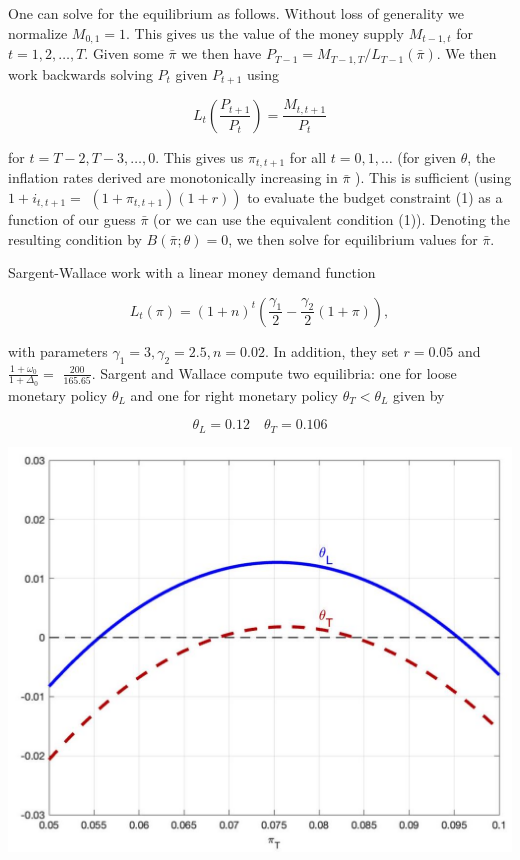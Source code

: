 \documentclass[10pt]{article}
\begin{document}
One can solve for the equilibrium as follows. Without loss of generality we normalize $M_{0,1}=1$. This gives us the value of the money supply $M_{t-1, t}$ for $t=1,2, \ldots, T$. Given some $\bar{\pi}$ we then have $P_{T-1}=M_{T-1, T} / L_{T-1}(\bar{\pi})$. We then work backwards solving $P_{t}$ given $P_{t+1}$ using

\begin{equation*}
L_{t}\left(\frac{P_{t+1}}{P_{t}}\right)=\frac{M_{t, t+1}}{P_{t}}
\end{equation*}

for $t=T-2, T-3, \ldots, 0$. This gives us $\pi_{t, t+1}$ for all $t=0,1, \ldots$ (for given $\theta$, the inflation rates derived are monotonically increasing in $\bar{\pi}$ ). This is sufficient (using $1+i_{t, t+1}=$ $\left.\left(1+\pi_{t, t+1}\right)(1+r)\right)$ to evaluate the budget constraint (1) as a function of our guess $\bar{\pi}$ (or we can use the equivalent condition (1)). Denoting the resulting condition by $B(\bar{\pi} ; \theta)=0$, we then solve for equilibrium values for $\bar{\pi}$.

Sargent-Wallace work with a linear money demand function

\begin{equation*}
L_{t}(\pi)=(1+n)^{t}\left(\frac{\gamma_{1}}{2}-\frac{\gamma_{2}}{2}(1+\pi)\right),
\end{equation*}

with parameters $\gamma_{1}=3, \gamma_{2}=2.5, n=0.02$. In addition, they set $r=0.05$ and $\frac{1+\omega_{0}}{1+\Delta_{0}}=$ $\frac{200}{165.65}$. Sargent and Wallace compute two equilibria: one for loose monetary policy $\theta_{L}$ and one for right monetary policy $\theta_{T}<\theta_{L}$ given by

\begin{equation*}
\theta_{L}=0.12 \quad \theta_{T}=0.106
\end{equation*}

\begin{center}
\includegraphics[max width=\textwidth]{2024_12_20_6e24ae1385cdc0ea3304g-17}
\end{center}
\end{document}
